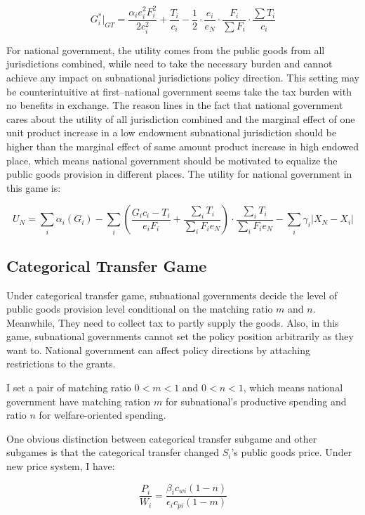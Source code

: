 \begin{itemize}
\begin{equation}
  G_i^*|_{GT}=\frac{\alpha_i e_i^2F_i^2}{2c_i^2}+\frac{T_i}{c_i}-\frac{1}{2}\cdot \frac{e_i}{e_N}\cdot \frac{F_i}{\sum F_i} \cdot \frac{\sum T_i}{c_i}
\end{equation} \label{gofgeneral}


For national government, the utility comes from the public goods from all jurisdictions combined, while need to take the necessary burden and cannot achieve any impact on subnational jurisdictions policy direction. This setting may be counterintuitive at first--national government seems take the tax burden with no benefits in exchange. The reason lines in the fact that national government cares about the utility of all jurisdiction combined and the marginal effect of one unit product increase in a low endowment subnational jurisdiction should be higher than the marginal effect of same amount product increase in high endowed place, which means national government should be motivated to equalize the public goods provision in different places. The utility for national government in this game is:

\begin{equation}
  U_N=\sum_i \alpha_i(G_i)-\sum_i(\frac{G_ic_i-T_i}{e_iF_i}+\frac{\sum_iT_i}{\sum_iF_ie_N})\cdot \frac{\sum_iT_i}{\sum_iF_ie_N}-\sum_i \gamma_i|X_N-X_i|
\end{equation}

\subsection{Categorical Transfer Game}
Under categorical transfer game, subnational governments decide the level of public goods provision level conditional on the matching ratio $m$ and $n$. Meanwhile, They need to collect tax to partly supply the goods. Also, in this game, subnational governments cannot set the policy position arbitrarily as they want to. National government can affect policy directions by attaching restrictions to the grants.

I set a pair of matching ratio $0 < m <1$ and $0<n<1$, which means national government have matching ration $m$ for subnational's productive spending and ratio $n$ for welfare-oriented spending.

One obvious distinction between categorical transfer subgame and other subgames is that the categorical transfer changed $S_i$'s public goods price.
Under new price system, I have:

$$\frac{P_i}{W_i}=\frac{\beta_ic_{wi}(1-n)}{\epsilon_ic_{pi}(1-m)}$$


\end{itemize}
